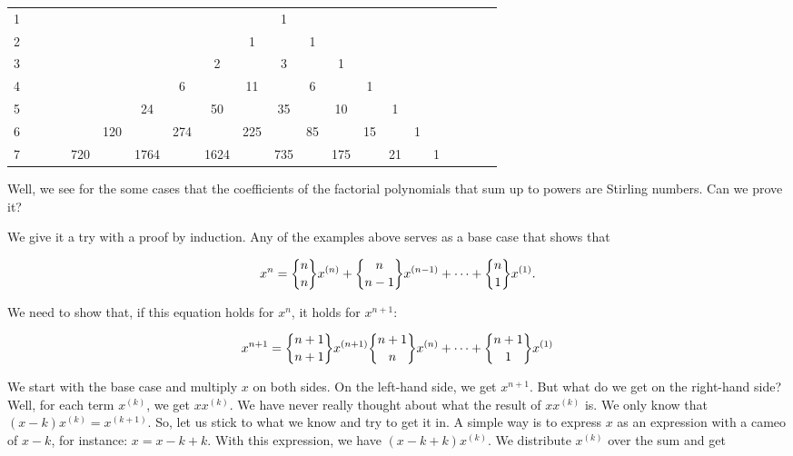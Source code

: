 \documentclass[tikz]{scrreprt}
\begin{document}
\begin{tabular}{l c c c c c c c c c c c c c c c c c c c c}
1 &   &   &   &   &    &    &    &     &     &   1 &     &     &    &    &    &   &   &   &   &  \\
2 &   &   &   &   &    &    &    &     &   1 &     &   1 &     &    &    &    &   &   &   &   &  \\
3 &   &   &   &   &    &    &    &   2 &     &   3 &     &   1 &    &    &    &   &   &   &   &  \\
4 &   &   &   &   &    &    &  6 &     &  11 &     &   6 &     &  1 &    &    &   &   &   &   &  \\
5 &   &   &   &   &    & 24 &    &  50 &     &  35 &     &  10 &    &  1 &    &   &   &   &   &  \\
6 &   &   &   &   & 120&    &274 &     & 225 &     &  85 &     & 15 &    &  1 &   &   &   &   &  \\   
7 &   &   &   &720&    &1764&    &1624 &     & 735 &     & 175 &    & 21 &    & 1 &   &   &   &  
\end{tabular}

Well, we see for the some cases that the coefficients
of the factorial polynomials that sum up to powers are
Stirling numbers. Can we prove it?

We give it a try with a proof by induction.
Any of the examples above serves as a base case that shows that

\begin{equation}
x^n = \stirlingTwo{n}{n}x^{(n)} + \stirlingTwo{n}{n-1}x^{(n-1)} + \dots + \stirlingTwo{n}{1}x^{(1)}.
\end{equation}

We need to show that, if this equation holds for $x^n$, it holds for $x^{n+1}$:

\begin{equation}
x^{n+1} = \stirlingTwo{n+1}{n+1}x^{(n+1)}
          \stirlingTwo{n+1}{n}x^{(n)} + \dots + 
          \stirlingTwo{n+1}{1}x^{(1)}
\end{equation}

We start with the base case and multiply $x$ on both sides.
On the left-hand side, we get $x^{n+1}$. But what do we get
on the right-hand side?
Well, for each term $x^{(k)}$, we get $xx^{(k)}$.
We have never really thought about what the result of $xx^{(k)}$ is.
We only know that $(x-k)x^{(k)} = x^{(k+1)}$.
So, let us stick to what we know and try to get it in.
A simple way is to express $x$ as an expression with a cameo of $x-k$,
for instance: $x = x-k+k$.
With this expression, we have $(x-k+k)x^{(k)}$.
We distribute $x^{(k)}$ over the sum and get
\end{document}

